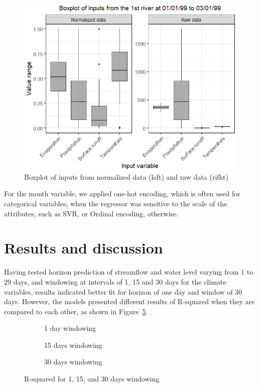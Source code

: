 \documentclass[12pt]{article}
\begin{document}
\begin{figure}[htbp]
  \centering
  \includegraphics[width=0.8\linewidth, trim=0cm 0 0 .7cm,clip=true]{Figures/Normalização.png}
  \caption{Boxplot of inputs from normalized data (left) and raw data (rifht)}
  \label{fig:Normalized}
\end{figure}

For the month variable, we applied one-hot encoding, which is often used for categorical variables, when the regressor was sensitive to the scale of the attributes, such as SVR, or Ordinal encoding, otherwise.

\section{Results and discussion}
\label{sec:ResultsDiscussion}

Having tested horizon prediction of streamflow and water level varying from 1 to 29 days, and windowing at intervals of 1, 15 and 30 days for the climate variables, results indicated better fit for horizon of one day and window of 30 days. However, the models presented different results of R-squared when they are compared to each other, as shown in Figure~\ref{fig:r2}.

\begin{figure}[htbp]
    \centering
    \begin{subfigure}[b]{.49\textwidth}
        \centering
        
        \caption{1 day windowing}
        \label{fig:r2_1}
    \end{subfigure}
    \begin{subfigure}[b]{.49\textwidth}
        \centering
        
        \caption{15 days windowing}
        \label{fig:r2_15}
    \end{subfigure}
    \begin{subfigure}[b]{\textwidth}
        \centering
        
        \captionsetup{justification=justified,singlelinecheck=false}
        \caption{30 days windowing}
        \label{fig:r2_30}
    \end{subfigure}
    \caption{R-squared for  1,  15, and  30 days windowing}
    \label{fig:r2}
\end{figure}
\end{document}
